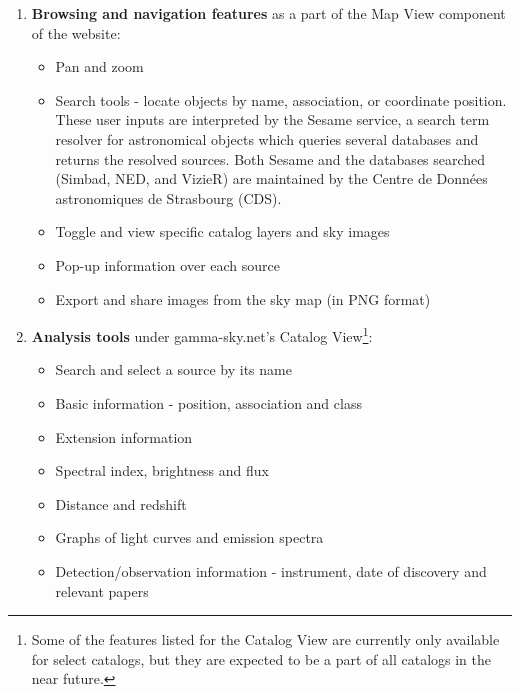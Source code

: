   \begin{enumerate}

    \item \textbf{Browsing and navigation features} as a part of the Map View component of the website:

      \begin{itemize}

        \item Pan and zoom
        \item Search tools - locate objects by name, association, or coordinate position. These user inputs are interpreted by the Sesame service, a search term resolver for astronomical objects which queries several databases and returns the resolved sources. Both Sesame and the databases searched (Simbad, NED, and VizieR) are maintained by the Centre de Donn\'{e}es astronomiques de Strasbourg (CDS).
        \item Toggle and view specific catalog layers and sky images
        \item Pop-up information over each source
        \item Export and share images from the sky map (in PNG format)

      \end{itemize}

    \item \textbf{Analysis tools} under gamma-sky.net's Catalog View\footnote[1]{Some of the features listed for the Catalog View are currently only available for select catalogs, but they are expected to be a part of all catalogs in the near future.}:

      \begin{itemize}

        \item Search and select a source by its name
        \item Basic information - position, association and class
        \item Extension information
        \item Spectral index, brightness and flux
        \item Distance and redshift
        \item Graphs of light curves and emission spectra
        \item Detection/observation information - instrument, date of discovery and relevant papers

      \end{itemize}

  \end{enumerate}
